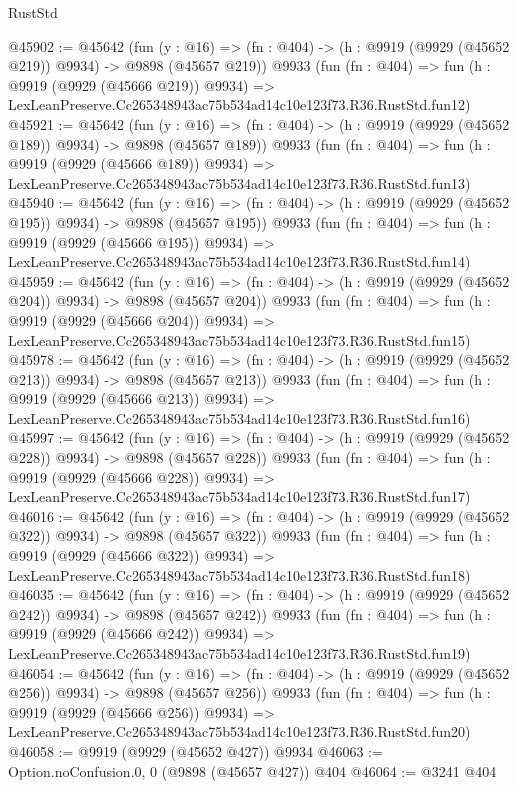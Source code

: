\begin{lexlean}{RustStd}
\begin{coremodule}
@45902 := @45642
    (fun (y : @16) => (fn : @404) -> (h : @9919 (@9929 (@45652 @219)) @9934) -> @9898 (@45657 @219))
    @9933
    (fun (fn : @404) =>
    fun (h : @9919 (@9929 (@45666 @219)) @9934) =>
    LexLeanPreserve.Cc265348943ac75b534ad14c10e123f73.R36.RustStd.fun12)
@45921 := @45642
    (fun (y : @16) => (fn : @404) -> (h : @9919 (@9929 (@45652 @189)) @9934) -> @9898 (@45657 @189))
    @9933
    (fun (fn : @404) =>
    fun (h : @9919 (@9929 (@45666 @189)) @9934) =>
    LexLeanPreserve.Cc265348943ac75b534ad14c10e123f73.R36.RustStd.fun13)
@45940 := @45642
    (fun (y : @16) => (fn : @404) -> (h : @9919 (@9929 (@45652 @195)) @9934) -> @9898 (@45657 @195))
    @9933
    (fun (fn : @404) =>
    fun (h : @9919 (@9929 (@45666 @195)) @9934) =>
    LexLeanPreserve.Cc265348943ac75b534ad14c10e123f73.R36.RustStd.fun14)
@45959 := @45642
    (fun (y : @16) => (fn : @404) -> (h : @9919 (@9929 (@45652 @204)) @9934) -> @9898 (@45657 @204))
    @9933
    (fun (fn : @404) =>
    fun (h : @9919 (@9929 (@45666 @204)) @9934) =>
    LexLeanPreserve.Cc265348943ac75b534ad14c10e123f73.R36.RustStd.fun15)
@45978 := @45642
    (fun (y : @16) => (fn : @404) -> (h : @9919 (@9929 (@45652 @213)) @9934) -> @9898 (@45657 @213))
    @9933
    (fun (fn : @404) =>
    fun (h : @9919 (@9929 (@45666 @213)) @9934) =>
    LexLeanPreserve.Cc265348943ac75b534ad14c10e123f73.R36.RustStd.fun16)
@45997 := @45642
    (fun (y : @16) => (fn : @404) -> (h : @9919 (@9929 (@45652 @228)) @9934) -> @9898 (@45657 @228))
    @9933
    (fun (fn : @404) =>
    fun (h : @9919 (@9929 (@45666 @228)) @9934) =>
    LexLeanPreserve.Cc265348943ac75b534ad14c10e123f73.R36.RustStd.fun17)
@46016 := @45642
    (fun (y : @16) => (fn : @404) -> (h : @9919 (@9929 (@45652 @322)) @9934) -> @9898 (@45657 @322))
    @9933
    (fun (fn : @404) =>
    fun (h : @9919 (@9929 (@45666 @322)) @9934) =>
    LexLeanPreserve.Cc265348943ac75b534ad14c10e123f73.R36.RustStd.fun18)
@46035 := @45642
    (fun (y : @16) => (fn : @404) -> (h : @9919 (@9929 (@45652 @242)) @9934) -> @9898 (@45657 @242))
    @9933
    (fun (fn : @404) =>
    fun (h : @9919 (@9929 (@45666 @242)) @9934) =>
    LexLeanPreserve.Cc265348943ac75b534ad14c10e123f73.R36.RustStd.fun19)
@46054 := @45642
    (fun (y : @16) => (fn : @404) -> (h : @9919 (@9929 (@45652 @256)) @9934) -> @9898 (@45657 @256))
    @9933
    (fun (fn : @404) =>
    fun (h : @9919 (@9929 (@45666 @256)) @9934) =>
    LexLeanPreserve.Cc265348943ac75b534ad14c10e123f73.R36.RustStd.fun20)
@46058 := @9919 (@9929 (@45652 @427)) @9934
@46063 := Option.noConfusion.{0, 0} (@9898 (@45657 @427)) @404
@46064 := @3241 @404

\end{coremodule}
\end{lexlean}
